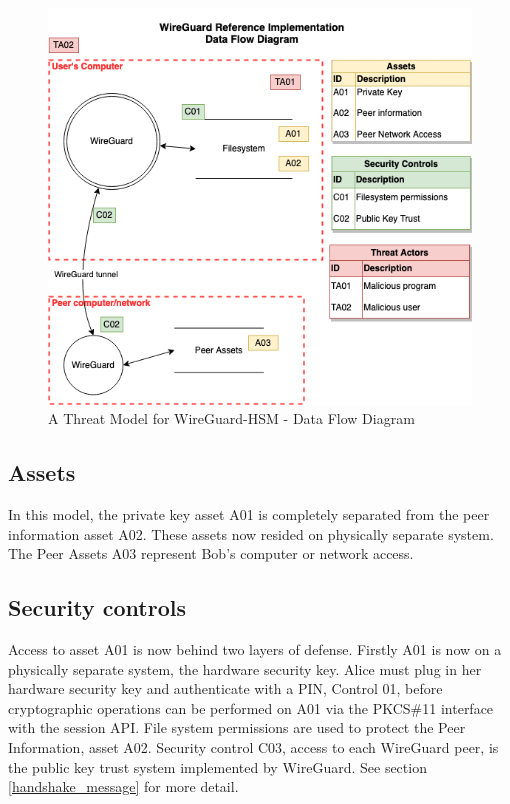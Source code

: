 \documentclass [11pt, proquest] {uwthesis}[2020/02/24]
\begin{document}
\begin{figure}[ht]
\includegraphics[width=14cm]{paper/images/WGH_DFD.drawio.png}
\caption{A Threat Model for WireGuard-HSM - Data Flow Diagram}
\label{fig:wg_hsm_dfd}
\end{figure}

\subsection{Assets}
In this model, the private key asset A01 is completely separated from the peer information asset A02. These assets now resided on physically separate system. The Peer Assets A03 represent Bob's computer or network access.

\subsection{Security controls}
Access to asset A01 is now behind two layers of defense. Firstly A01 is now on a physically separate system, the hardware security key. Alice must plug in her hardware security key and authenticate with a PIN, Control 01, before cryptographic operations can be performed on A01 via the PKCS\#11 interface with the session API.
File system permissions are used to protect the Peer Information, asset A02.
Security control C03, access to each WireGuard peer, is the public key trust system implemented by WireGuard. See section \ref{handshake_message} for more detail.
\end{document}
